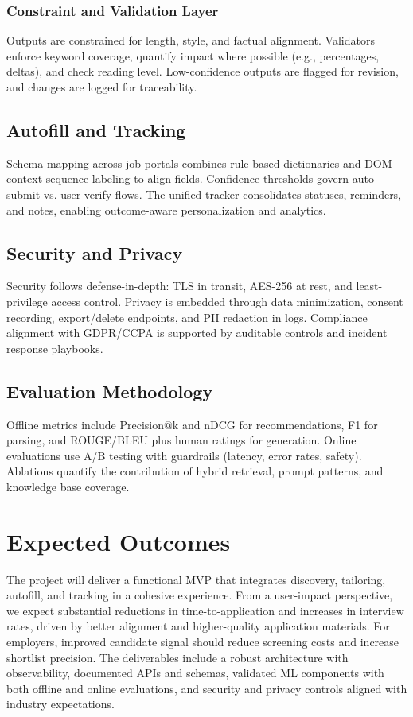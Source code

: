 \documentclass[12pt,a4paper]{report}
\begin{document}
\subsection{Constraint and Validation Layer}
Outputs are constrained for length, style, and factual alignment. Validators enforce keyword coverage, quantify impact where possible (e.g., percentages, deltas), and check reading level. Low-confidence outputs are flagged for revision, and changes are logged for traceability.

\section{Autofill and Tracking}
Schema mapping across job portals combines rule-based dictionaries and DOM-context sequence labeling to align fields. Confidence thresholds govern auto-submit vs. user-verify flows. The unified tracker consolidates statuses, reminders, and notes, enabling outcome-aware personalization and analytics.

\section{Security and Privacy}
Security follows defense-in-depth: TLS in transit, AES-256 at rest, and least-privilege access control. Privacy is embedded through data minimization, consent recording, export/delete endpoints, and PII redaction in logs. Compliance alignment with GDPR/CCPA is supported by auditable controls and incident response playbooks.

\section{Evaluation Methodology}
Offline metrics include Precision@k and nDCG for recommendations, F1 for parsing, and ROUGE/BLEU plus human ratings for generation. Online evaluations use A/B testing with guardrails (latency, error rates, safety). Ablations quantify the contribution of hybrid retrieval, prompt patterns, and knowledge base coverage.

\chapter{Expected Outcomes}
The project will deliver a functional MVP that integrates discovery, tailoring, autofill, and tracking in a cohesive experience. From a user-impact perspective, we expect substantial reductions in time-to-application and increases in interview rates, driven by better alignment and higher-quality application materials. For employers, improved candidate signal should reduce screening costs and increase shortlist precision. The deliverables include a robust architecture with observability, documented APIs and schemas, validated ML components with both offline and online evaluations, and security and privacy controls aligned with industry expectations.
\end{document}
